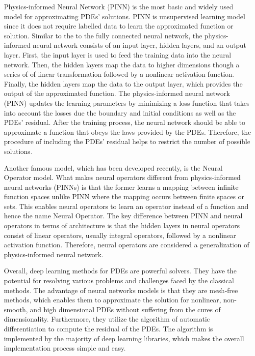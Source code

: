\documentclass[a4paper, 12pt]{article}
\begin{document}
Physics-informed Neural Network (PINN) is the most basic and widely used model for approximating PDEs' solutions. PINN is unsupervised learning model since it does not require labelled data to learn the approximated function or solution. Similar to the to the fully connected neural network, the physics-informed neural network consists of an input layer, hidden layers, and an output layer. First, the input layer is used to feed the training data into the neural network.  Then, the hidden layers map the data to higher dimensions though a series of of linear transformation followed by a nonlinear activation function. Finally, the hidden layers map the data to the output layer, which provides the output of the approximated function. The physics-informed neural network (PINN) updates the learning parameters by minimizing a loss function that takes into account the losses due the boundary and initial conditions as well as the PDEs' residual. After the training process, the neural network should be able to approximate a function that obeys the laws provided by the PDEs. Therefore, the procedure of including the PDEs' residual helps to restrict the number of possible solutions. 

Another famous model, which has been developed recently, is the Neural Operator model. What makes neural operators different from physics-informed neural networks (PINNs) is that the former learns a mapping between infinite function spaces unlike PINN where the mapping occurs between finite spaces or sets. This enables neural operators to learn an operator instead of a function and hence the name Neural Operator. The key difference between PINN and neural operators in terms of architecture is that the hidden layers in neural operators consist of linear operators, usually integral operators, followed by a nonlinear activation function. Therefore, neural operators are considered a generalization of physics-informed neural network.

Overall, deep learning methods for PDEs are powerful solvers. They have the potential for resolving various problems and challenges faced by the classical methods. The advantage of neural networks models is that they are mesh-free methods, which enables them to approximate the solution for nonlinear, non-smooth, and high dimensional PDEs without suffering from the cures of dimensionality. Furthermore, they utilize the algorithm of automatic differentiation to compute the residual of the PDEs. The algorithm is implemented by the majority of deep learning libraries, which makes the overall implementation process simple and easy. 
\end{document}
